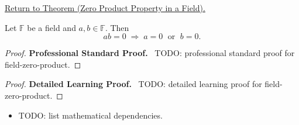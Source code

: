 \newpage
{}
\label{prf:field-zero-product}

\begin{remark*}[Return]
\hyperref[prop:field-zero-product]{Return to Theorem (Zero Product Property in a Field).}
\end{remark*}

\begin{theorem*}
Let $\mathbb{F}$ be a field and $a, b \in \mathbb{F}$. Then
\[
ab = 0 \;\Longrightarrow\; a = 0 \;\text{ or }\; b = 0.
\]
\end{theorem*}

\begin{proof}
\textbf{Professional Standard Proof.}~
TODO: professional standard proof for field-zero-product.
\end{proof}

\begin{proof}
\textbf{Detailed Learning Proof.}~
TODO: detailed learning proof for field-zero-product.
\end{proof}

\begin{remark*}
\end{remark*}

\begin{dependencies}
\begin{itemize}
  \item TODO: list mathematical dependencies.
\end{itemize}
\end{dependencies}

\clearpage
